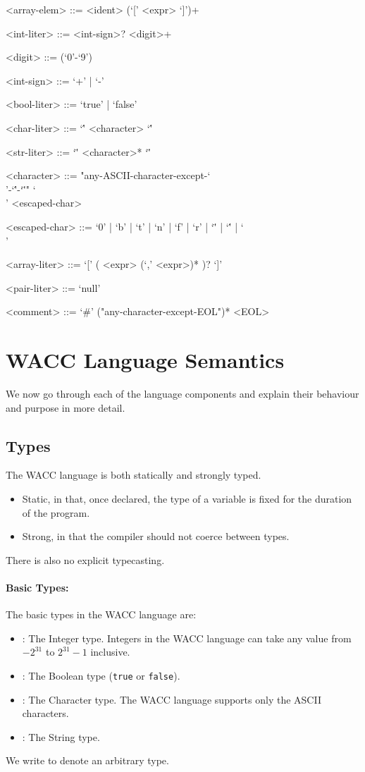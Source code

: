 \documentclass[a4paper]{article}
\newcommand{\shell}[1]{\lstinline{#1}}
\theoremstyle{definition}
\begin{document}
\begin{grammar}
  <array-elem> ::= <ident> (`[' <expr> `]')+

  <int-liter> ::= <int-sign>? <digit>+

  <digit> ::= (`0'-`9')

  <int-sign> ::= `+' | `-'

  <bool-liter> ::= `true' | `false'

  <char-liter> ::= `\'' <character> `\''

  <str-liter> ::= `\"' <character>* `\"'

  <character> ::= "any-ASCII-character-except-`\\'-`\''-`\"'"
    \alt `\\' <escaped-char>

  <escaped-char> ::= `0' | `b' | `t' | `n' | `f' | `r' | `\"' | `\'' | `\\'

  <array-liter> ::= `[' ( <expr> (`,' <expr>)* )? `]'

  <pair-liter> ::= `null'

  <comment> ::= `#' ("any-character-except-EOL")* <EOL>
\end{grammar}


\section{WACC Language Semantics}
We now go through each of the language components and explain their behaviour and purpose in more detail.

\subsection{Types}
The WACC language is both statically and strongly typed.
\begin{itemize}
  \item Static, in that, once declared, the type of a variable is fixed for the duration of the program.
  \item Strong, in that the compiler should not coerce between types.
\end{itemize}
There is also no explicit typecasting.

\paragraph{Basic Types:}
The basic types in the WACC language are:
\begin{itemize}
 \item {}: The Integer type. Integers in the WACC language can take any value from $-2^{31}$ to $2^{31} - 1$ inclusive.
 \item {}: The Boolean type (\shell{true} or \shell{false}).
 \item {}: The Character type. The WACC language supports only the ASCII characters.
 \item {}: The String type.
\end{itemize}
We write  to denote an arbitrary type.
\end{document}
